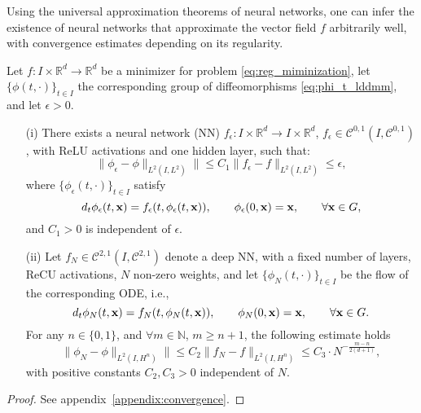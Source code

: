 Using the universal approximation theorems of neural networks, one can infer the existence of neural networks that approximate the vector field $f$ arbitrarily well, 
with convergence estimates depending on its regularity.
\begin{theorem}
  \label{theo:existreg}
Let  $f:I\times\mathbb{R}^d\rightarrow\mathbb{R}^d$ be a minimizer for problem \eqref{eq:reg_miminization}, let
$\{\phi(t, \cdot)\}_{t\in I}$ the corresponding group of diffeomorphisms \eqref{eq:phi_t_lddmm}, and let $\epsilon>0$. 
\begin{itemize}
\item[(i)]There exists a neural network (NN) $f_\epsilon: I\times \mathbb{R}^d\rightarrow  I\times \mathbb{R}^d$, $f_\epsilon\in\mathcal{C}^{0, 1}(I, \mathcal{C}^{0, 1})$,  with ReLU activations and one hidden layer, such that:
  \begin{equation*}
    \lVert \phi_\epsilon - \phi\rVert_{L^2(I, L^2)}\rVert \leq C_1 \lVert f_\epsilon - f\rVert_{L^2(I, L^2)} \leq \epsilon,
  \end{equation*}
  where  $\{\phi_\epsilon(t, \cdot)\}_{t\in I}$ satisfy
 \begin{equation*}
    d_t \phi_\epsilon(t, \mathbf{x}) = f_\epsilon(t, \phi_\epsilon(t, \mathbf{x})),\qquad \phi_\epsilon(0, \mathbf{x}) = \mathbf{x},\qquad\forall\mathbf{x}\in G,
  \end{equation*}
and $C_1>0$ is independent of $\epsilon$.
  
\item[(ii)] Let $f_N\in\mathcal{C}^{2, 1}(I, \mathcal{C}^{2, 1})$ denote a deep NN, with a  fixed number of layers, ReCU activations, $N$ non-zero weights, and
let $\{\phi_N(t, \cdot)\}_{t\in I}$ be the flow of the corresponding ODE, i.e., 
  \begin{equation*}
    d_t \phi_N(t, \mathbf{x}) = f_N(t, \phi_N(t, \mathbf{x})),\qquad \phi_N(0, \mathbf{x}) = \mathbf{x},\qquad\forall\mathbf{x}\in G.
  \end{equation*}
For any $n\in\{0, 1\}$, and $\forall m\in\mathbb{N}$, $m\geq n+1$, the following estimate holds
  \begin{equation*}
    \lVert \phi_N - \phi\rVert_{L^2(I, H^n)}\rVert \leq C_2 \lVert f_N - f\rVert_{L^2(I, H^n)} \leq C_3\cdot N^{-\frac{m-n}{2(d+1)}},
  \end{equation*}
  with positive constants $C_2, C_3>0$ independent of $N$.
  \end{itemize}
\end{theorem}

\begin{proof}
See appendix~\ref{appendix:convergence}.
\end{proof}

